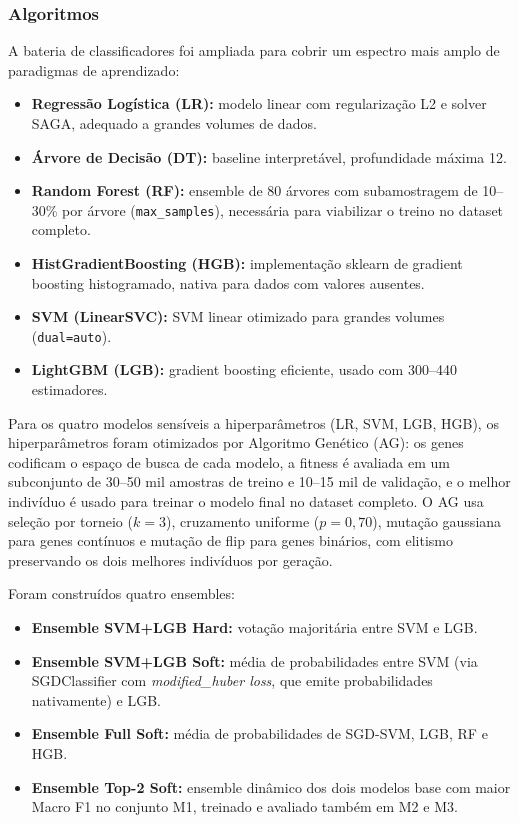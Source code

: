\documentclass[12pt]{article}
\begin{document}
\subsubsection{Algoritmos}

A bateria de classificadores foi ampliada para cobrir um espectro mais
amplo de paradigmas de aprendizado:

\begin{itemize}
  \item \textbf{Regressão Logística (LR):} modelo linear com regularização
        L2 e solver SAGA, adequado a grandes volumes de dados.
  \item \textbf{Árvore de Decisão (DT):} baseline interpretável,
        profundidade máxima 12.
  \item \textbf{Random Forest (RF):} ensemble de 80 árvores com
        subamostragem de 10--30\% por árvore (\texttt{max\_samples}),
        necessária para viabilizar o treino no dataset completo.
  \item \textbf{HistGradientBoosting (HGB):} implementação sklearn de
        gradient boosting histogramado, nativa para dados com valores
        ausentes.
  \item \textbf{SVM (LinearSVC):} SVM linear otimizado para grandes
        volumes (\texttt{dual=auto}).
  \item \textbf{LightGBM (LGB):} gradient boosting eficiente, usado com
        300--440 estimadores.
\end{itemize}

Para os quatro modelos sensíveis a hiperparâmetros (LR, SVM, LGB, HGB),
os hiperparâmetros foram otimizados por Algoritmo Genético (AG): os genes
codificam o espaço de busca de cada modelo, a fitness é avaliada em um
subconjunto de 30--50 mil amostras de treino e 10--15 mil de validação, e
o melhor indivíduo é usado para treinar o modelo final no dataset
completo. O AG usa seleção por torneio ($k=3$), cruzamento uniforme
($p=0,70$), mutação gaussiana para genes contínuos e mutação de flip para
genes binários, com elitismo preservando os dois melhores indivíduos por
geração.

Foram construídos quatro ensembles:

\begin{itemize}
  \item \textbf{Ensemble SVM+LGB Hard:} votação majoritária entre SVM e
        LGB.
  \item \textbf{Ensemble SVM+LGB Soft:} média de probabilidades entre
        SVM (via SGDClassifier com \textit{modified\_huber loss}, que
        emite probabilidades nativamente) e LGB.
  \item \textbf{Ensemble Full Soft:} média de probabilidades de SGD-SVM,
        LGB, RF e HGB.
  \item \textbf{Ensemble Top-2 Soft:} ensemble dinâmico dos dois modelos
        base com maior Macro F1 no conjunto M1, treinado e avaliado
        também em M2 e M3.
\end{itemize}
\end{document}
